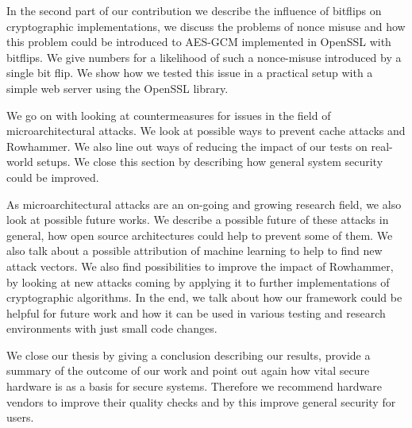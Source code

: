 In the second part of our contribution we describe the influence of bitflips on
cryptographic implementations, we discuss the problems of nonce misuse and how
this problem could be introduced to AES-GCM implemented in OpenSSL with
bitflips. We give numbers for a likelihood of such a nonce-misuse introduced by
a single bit flip. We show how we tested this issue in a practical setup with a
simple web server using the OpenSSL library.

We go on with looking at countermeasures for issues in the field of
microarchitectural attacks. We look at possible ways to prevent cache attacks
and Rowhammer. We also line out ways of reducing the impact of our tests on
real-world setups. We close this section by describing how general system
security could be improved.

As microarchitectural attacks are an on-going and growing research field, we
also look at possible future works. We describe a possible future of these
attacks in general, how open source architectures could help to prevent some of
them. We also talk about a possible attribution of machine learning to help to
find new attack vectors. We also find possibilities to improve the impact of
Rowhammer, by looking at new attacks coming by applying it to further
implementations of cryptographic algorithms. In the end, we talk about how our
framework could be helpful for future work and how it can be used in various
testing and research environments with just small code changes.

We close our thesis by giving a conclusion describing our results, provide a
summary of the outcome of our work and point out again how vital secure hardware
is as a basis for secure systems. Therefore we recommend hardware vendors to
improve their quality checks and by this improve general security for users.

